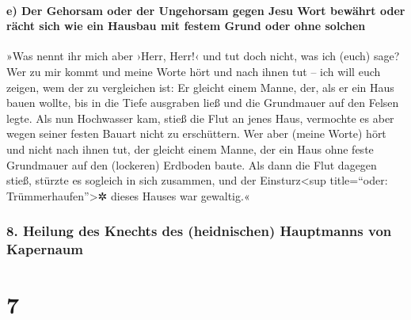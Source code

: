 \hypertarget{e-der-gehorsam-oder-der-ungehorsam-gegen-jesu-wort-bewuxe4hrt-oder-ruxe4cht-sich-wie-ein-hausbau-mit-festem-grund-oder-ohne-solchen}{%
\paragraph{e) Der Gehorsam oder der Ungehorsam gegen Jesu Wort bewährt
oder rächt sich wie ein Hausbau mit festem Grund oder ohne
solchen}\label{e-der-gehorsam-oder-der-ungehorsam-gegen-jesu-wort-bewuxe4hrt-oder-ruxe4cht-sich-wie-ein-hausbau-mit-festem-grund-oder-ohne-solchen}}

 »Was nennt ihr mich aber ›Herr, Herr!‹ und tut doch
nicht, was ich (euch) sage?  Wer zu mir kommt und meine
Worte hört und nach ihnen tut -- ich will euch zeigen, wem der zu
vergleichen ist:  Er gleicht einem Manne, der, als er ein
Haus bauen wollte, bis in die Tiefe ausgraben ließ und die Grundmauer
auf den Felsen legte. Als nun Hochwasser kam, stieß die Flut an jenes
Haus, vermochte es aber wegen seiner festen Bauart nicht zu erschüttern.
 Wer aber (meine Worte) hört und nicht nach ihnen tut,
der gleicht einem Manne, der ein Haus ohne feste Grundmauer auf den
(lockeren) Erdboden baute. Als dann die Flut dagegen stieß, stürzte es
sogleich in sich zusammen, und der Einsturz\textless sup title=``oder:
Trümmerhaufen''\textgreater✲ dieses Hauses war gewaltig.«

\hypertarget{heilung-des-knechts-des-heidnischen-hauptmanns-von-kapernaum}{%
\subsubsection{8. Heilung des Knechts des (heidnischen) Hauptmanns von
Kapernaum}\label{heilung-des-knechts-des-heidnischen-hauptmanns-von-kapernaum}}

\hypertarget{section-6}{%
\section{7}\label{section-6}}

